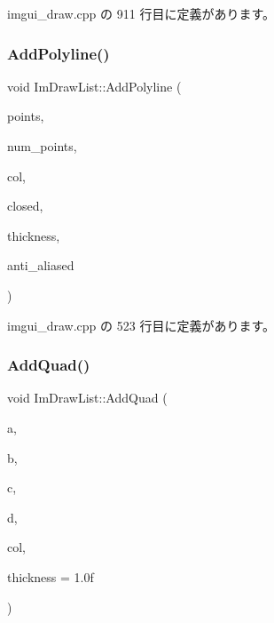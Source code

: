  imgui\+\_\+draw.\+cpp の 911 行目に定義があります。

\mbox{\label{struct_im_draw_list_a3ca939b6e4b35a93611d2d42d7e20434}} 
\subsubsection{\texorpdfstring{Add\+Polyline()}{AddPolyline()}}
{\footnotesize\ttfamily void Im\+Draw\+List\+::\+Add\+Polyline (\begin{DoxyParamCaption}\item[{const \mbox{\hyperlink{struct_im_vec2}{Im\+Vec2}} $\ast$}]{points,  }\item[{const int}]{num\+\_\+points,  }\item[{\mbox{\hyperlink{imgui_8h_a118cff4eeb8d00e7d07ce3d6460eed36}{Im\+U32}}}]{col,  }\item[{bool}]{closed,  }\item[{float}]{thickness,  }\item[{bool}]{anti\+\_\+aliased }\end{DoxyParamCaption})}



 imgui\+\_\+draw.\+cpp の 523 行目に定義があります。

\mbox{\label{struct_im_draw_list_ac3fd62862000b2a7a4e7f61da0a4e3fd}} 
\subsubsection{\texorpdfstring{Add\+Quad()}{AddQuad()}}
{\footnotesize\ttfamily void Im\+Draw\+List\+::\+Add\+Quad (\begin{DoxyParamCaption}\item[{const \mbox{\hyperlink{struct_im_vec2}{Im\+Vec2}} \&}]{a,  }\item[{const \mbox{\hyperlink{struct_im_vec2}{Im\+Vec2}} \&}]{b,  }\item[{const \mbox{\hyperlink{struct_im_vec2}{Im\+Vec2}} \&}]{c,  }\item[{const \mbox{\hyperlink{struct_im_vec2}{Im\+Vec2}} \&}]{d,  }\item[{\mbox{\hyperlink{imgui_8h_a118cff4eeb8d00e7d07ce3d6460eed36}{Im\+U32}}}]{col,  }\item[{float}]{thickness = {\ttfamily 1.0f} }\end{DoxyParamCaption})}



